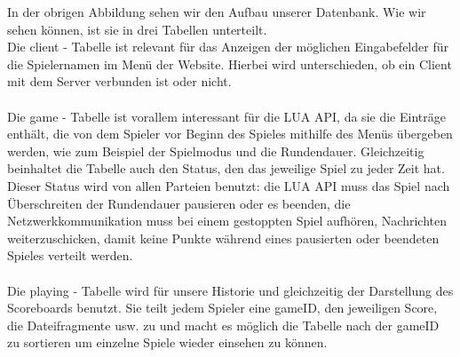 In der obrigen Abbildung sehen wir den Aufbau unserer Datenbank. Wie wir sehen können, ist sie in drei Tabellen unterteilt.\\
Die client - Tabelle ist relevant für das Anzeigen der möglichen Eingabefelder für die Spielernamen im Menü der Website. Hierbei wird unterschieden, ob ein Client mit dem Server verbunden ist oder nicht.\\\\
Die game - Tabelle ist vorallem interessant für die LUA API, da sie die Einträge enthält, die von dem Spieler vor Beginn des Spieles mithilfe des Menüs übergeben werden, wie zum Beispiel der Spielmodus und die Rundendauer. Gleichzeitig beinhaltet die Tabelle auch den Status, den das jeweilige Spiel zu jeder Zeit hat. Dieser Status wird von allen Parteien benutzt: die LUA API muss das Spiel nach Überschreiten der Rundendauer pausieren oder es beenden, die Netzwerkkommunikation muss bei einem gestoppten Spiel aufhören, Nachrichten weiterzuschicken, damit keine Punkte während eines pausierten oder beendeten Spieles verteilt werden.\\\\
Die playing - Tabelle wird für unsere Historie und gleichzeitig der Darstellung des Scoreboards benutzt. Sie teilt jedem Spieler eine gameID, den jeweiligen Score, die Dateifragmente usw. zu und macht es möglich die Tabelle nach der gameID zu sortieren um einzelne Spiele wieder einsehen zu können.

